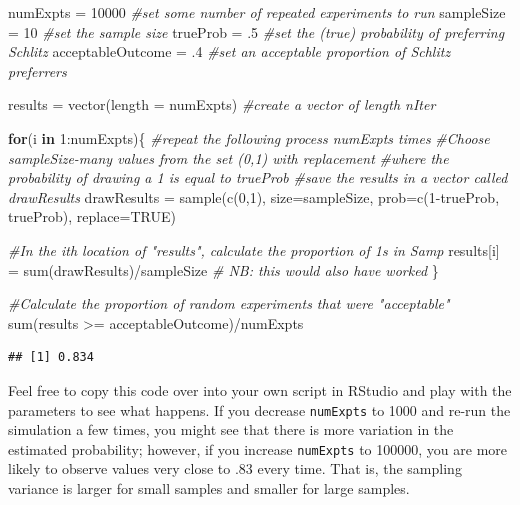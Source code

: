 \documentclass[
  openany]{book}
\newenvironment{Shaded}{\begin{snugshade}}{\end{snugshade}}
\newcommand{\AttributeTok}[1]{\textcolor[rgb]{0.77,0.63,0.00}{#1}}
\newcommand{\CommentTok}[1]{\textcolor[rgb]{0.56,0.35,0.01}{\textit{#1}}}
\newcommand{\ConstantTok}[1]{\textcolor[rgb]{0.00,0.00,0.00}{#1}}
\newcommand{\ControlFlowTok}[1]{\textcolor[rgb]{0.13,0.29,0.53}{\textbf{#1}}}
\newcommand{\DecValTok}[1]{\textcolor[rgb]{0.00,0.00,0.81}{#1}}
\newcommand{\FunctionTok}[1]{\textcolor[rgb]{0.00,0.00,0.00}{#1}}
\newcommand{\NormalTok}[1]{#1}
\newcommand{\OtherTok}[1]{\textcolor[rgb]{0.56,0.35,0.01}{#1}}
\newcommand{\SpecialCharTok}[1]{\textcolor[rgb]{0.00,0.00,0.00}{#1}}
\begin{document}
\begin{Shaded}
\begin{Highlighting}[]
\NormalTok{numExpts }\OtherTok{=} \DecValTok{10000} \CommentTok{\#set some number of repeated experiments to run}
\NormalTok{sampleSize }\OtherTok{=} \DecValTok{10} \CommentTok{\#set the sample size  }
\NormalTok{trueProb }\OtherTok{=}\NormalTok{ .}\DecValTok{5} \CommentTok{\#set the (true) probability of preferring Schlitz}
\NormalTok{acceptableOutcome }\OtherTok{=}\NormalTok{ .}\DecValTok{4} \CommentTok{\#set an acceptable proportion of Schlitz preferrers}

\NormalTok{results }\OtherTok{=} \FunctionTok{vector}\NormalTok{(}\AttributeTok{length =}\NormalTok{ numExpts) }\CommentTok{\#create a vector of length nIter}

\ControlFlowTok{for}\NormalTok{(i }\ControlFlowTok{in} \DecValTok{1}\SpecialCharTok{:}\NormalTok{numExpts)\{ }\CommentTok{\#repeat the following process numExpts times}
   \CommentTok{\#Choose sampleSize{-}many values from the set (0,1) with replacement}
   \CommentTok{\#where the probability of drawing a 1 is equal to trueProb}
   \CommentTok{\#save the results in a vector called drawResults}
\NormalTok{   drawResults }\OtherTok{=} \FunctionTok{sample}\NormalTok{(}\FunctionTok{c}\NormalTok{(}\DecValTok{0}\NormalTok{,}\DecValTok{1}\NormalTok{), }\AttributeTok{size=}\NormalTok{sampleSize, }\AttributeTok{prob=}\FunctionTok{c}\NormalTok{(}\DecValTok{1}\SpecialCharTok{{-}}\NormalTok{trueProb, trueProb), }\AttributeTok{replace=}\ConstantTok{TRUE}\NormalTok{)}
   
   \CommentTok{\#In the ith location of "results", calculate the proportion of 1s in Samp}
\NormalTok{   results[i] }\OtherTok{=} \FunctionTok{sum}\NormalTok{(drawResults)}\SpecialCharTok{/}\NormalTok{sampleSize}
   \CommentTok{\# NB: this would also have worked }
\NormalTok{\}}

\CommentTok{\#Calculate the proportion of random experiments that were "acceptable"}
\FunctionTok{sum}\NormalTok{(results }\SpecialCharTok{\textgreater{}=}\NormalTok{ acceptableOutcome)}\SpecialCharTok{/}\NormalTok{numExpts}
\end{Highlighting}
\end{Shaded}

\begin{verbatim}
## [1] 0.834
\end{verbatim}

Feel free to copy this code over into your own script in RStudio and play with the parameters to see what happens. If you decrease \texttt{numExpts} to 1000 and re-run the simulation a few times, you might see that there is more variation in the estimated probability; however, if you increase \texttt{numExpts} to 100000, you are more likely to observe values very close to .83 every time. That is, the sampling variance is larger for small samples and smaller for large samples.
\end{document}
